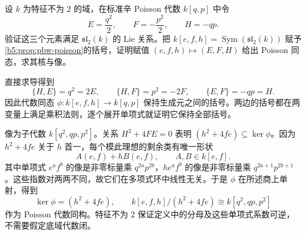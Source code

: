 \begin{exercise}\label{b5:ex:15-sl2-quadratic-poisson}
	设 \(k\) 为特征不为 \(2\) 的域，在标准辛 Poisson 代数 \(k[q,p]\) 中令
	\[
		E=\frac{q^2}{2},\qquad F=-\frac{p^2}{2},\qquad H=-qp.
	\]
	验证这三个元素满足 \(\mathfrak{sl}_2(k)\) 的 Lie 关系。把 \(k[e,f,h]=\operatorname{Sym}(\mathfrak{sl}_2(k))\) 赋予\cref{b5:prop:pbw-poisson}的括号，证明赋值 \((e,f,h)\mapsto(E,F,H)\) 给出 Poisson 同态，求其核与像。
\end{exercise}
\begin{solution}
	直接求导得到
	\[
		\{H,E\}=q^2=2E,\qquad
		\{H,F\}=p^2=-2F,\qquad
		\{E,F\}=-qp=H.
	\]
	因此代数同态 \(\phi:k[e,f,h]\to k[q,p]\) 保持生成元之间的括号。两边的括号都在两变量上满足乘积法则，逐个展开单项式就证明它保持全部括号。

	像为子代数 \(k[q^2,qp,p^2]\)。关系 \(H^2+4FE=0\) 表明 \((h^2+4fe)\subseteq\ker\phi\)。因为 \(h^2+4fe\) 关于 \(h\) 首一，每个模此理想的剩余类有唯一形状
	\[
		A(e,f)+hB(e,f),\qquad A,B\in k[e,f].
	\]
	其中单项式 \(e^af^b\) 的像是非零标量乘 \(q^{2a}p^{2b}\)，\(he^af^b\) 的像是非零标量乘 \(q^{2a+1}p^{2b+1}\)。这些指数对两两不同，故它们在多项式环中线性无关。于是 \(\phi\) 在所述商上单射，得到
	\[
		\ker\phi=(h^2+4fe),\qquad
		k[e,f,h]/(h^2+4fe)\cong k[q^2,qp,p^2]
	\]
	作为 Poisson 代数同构。特征不为 \(2\) 保证定义中的分母及这些单项式系数可逆，不需要假定底域代数闭。
\end{solution}
